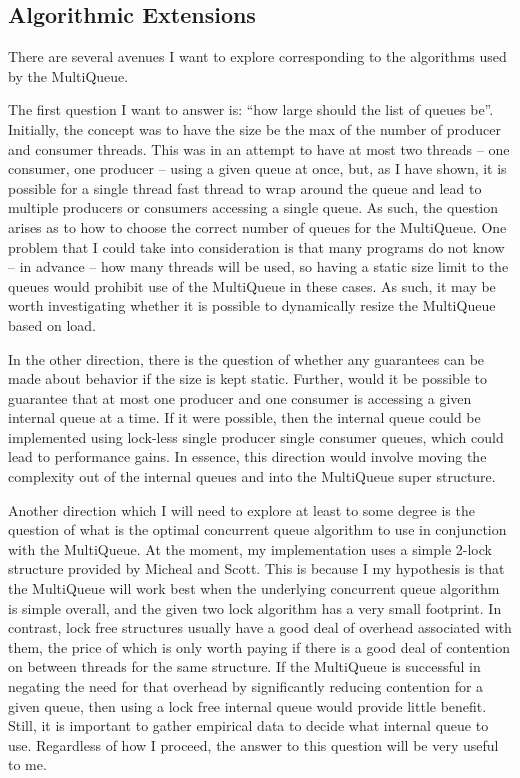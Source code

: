 \documentclass[12pt]{report}
\begin{document}
\subsection{Algorithmic Extensions}
There are several avenues I want to explore corresponding to the algorithms
used by the MultiQueue.

The first question I want to answer is: ``how large should the list of queues
be''. Initially, the concept was to have the size be the max of the number of
producer and consumer threads. This was in an attempt to have at most two
threads -- one consumer, one producer -- using a given queue at once, but, as I
have shown, it is possible for a single thread fast thread to wrap around the
queue and lead to multiple producers or consumers accessing a single queue. As
such, the question arises as to how to choose the correct number of queues for
the MultiQueue. One problem that I could take into consideration is that many
programs do not know -- in advance -- how many threads will be used, so having
a static size limit to the queues would prohibit use of the MultiQueue in these
cases. As such, it may be worth investigating whether it is possible to
dynamically resize the MultiQueue based on load.

In the other direction, there is the question of whether any guarantees can be
made about behavior if the size is kept static. Further, would it be possible
to guarantee that at most one producer and one consumer is accessing a given
internal queue at a time. If it were possible, then the internal queue could be
implemented using lock-less single producer single consumer queues, which could
lead to performance gains. In essence, this direction would involve moving the
complexity out of the internal queues and into the MultiQueue super structure.

Another direction which I will need to explore at least to some degree is the
question of what is the optimal concurrent queue algorithm to use in
conjunction with the MultiQueue. At the moment, my implementation uses a simple
2-lock structure provided by Micheal and Scott\cite{michael1996}. This is
because I my hypothesis is that the MultiQueue will work best when the
underlying concurrent queue algorithm is simple overall, and the given two lock
algorithm has a very small footprint. In contrast, lock free structures usually
have a good deal of overhead associated with them, the price of which is only
worth paying if there is a good deal of contention on between threads for the
same structure. If the MultiQueue is successful in negating the need for that
overhead by significantly reducing contention for a given queue, then using a
lock free internal queue would provide little benefit. Still, it is important
to gather empirical data to decide what internal queue to use. Regardless of
how I proceed, the answer to this question will be very useful to me.
\end{document}
